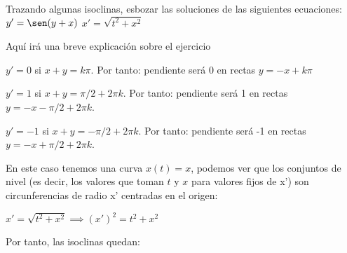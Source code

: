 \documentclass[nochap]{apuntes}
\begin{document}
\begin{problem}[5]
Trazando algunas isoclinas, esbozar las soluciones de las siguientes ecuaciones:
\ppart $y'=\sen (y+x)$
\ppart $x'= \sqrt{t^2+x^2}$

\solution

\begin{expla}
Aquí irá una breve explicación sobre el ejercicio
\end{expla}

\spart
$y'=0$ si $x+y=k\pi$. Por tanto: pendiente será 0 en rectas $y=-x+k\pi$

$y'=1$ si $x+y=\pi/2 +2\pi k$. Por tanto: pendiente será 1 en rectas $y=-x-\pi/2+2\pi k$.

$y'=-1$ si $x+y=-\pi/2 +2\pi k$. Por tanto: pendiente será -1 en rectas $y=-x+\pi/2+2\pi k$.

\newpage
\spart 
En este caso tenemos una curva $x(t)=x$, podemos ver que los conjuntos de nivel (es decir, los valores que toman $t$ y $x$ para valores fijos de x') son circunferencias de radio x' centradas en el origen:

$x'= \sqrt{t^2+x^2} \implies  (x')^2= t^2+x^2$

Por tanto, las isoclinas quedan:

\end{problem}
\newpage
\end{document}
